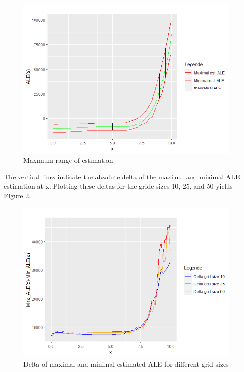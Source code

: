 \documentclass[
]{krantz}
\begin{document}
\begin{figure}
\includegraphics[width=1\linewidth]{images/ALE_2_ALErange_10_} \caption{Maximum range of estimation}\label{fig:exampleALE2b}
\end{figure}



The vertical lines indicate the absolute delta of the maximal and minimal ALE estimation at x. Plotting these deltas for the gride sizes 10, 25, and 50 yields Figure \ref{fig:exampleALE2c}.

\begin{figure}
\includegraphics[width=1\linewidth]{images/ALE_2_example2.1_delta_} \caption{Delta of maximal and minimal estimated ALE for different grid sizes}\label{fig:exampleALE2c}
\end{figure}
\end{document}
